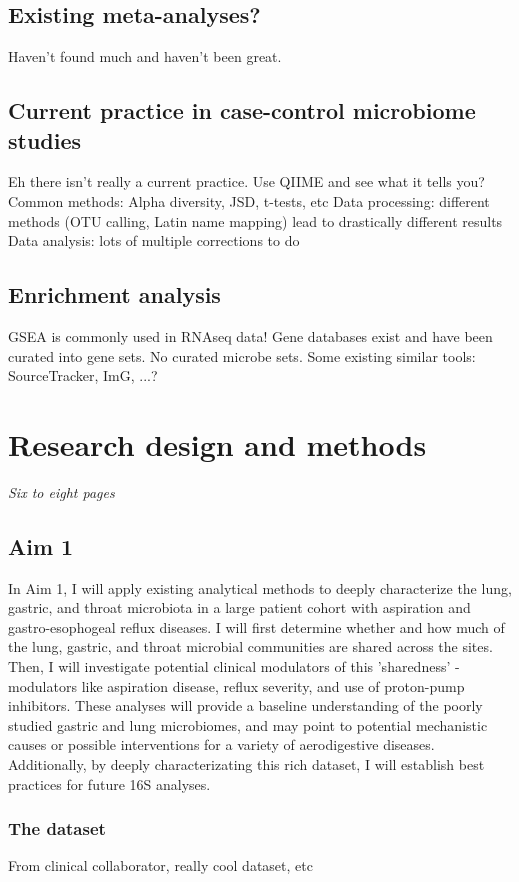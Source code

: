 \documentclass[12pt]{article}
\begin{document}
\subsection*{Existing meta-analyses?}
Haven't found much and haven't been great.

\subsection*{Current practice in case-control microbiome studies}
Eh there isn't really a current practice. Use QIIME and see what it tells you?
Common methods: Alpha diversity, JSD, t-tests, etc
Data processing: different methods (OTU calling, Latin name mapping) lead to drastically different results
Data analysis: lots of multiple corrections to do

\subsection*{Enrichment analysis}
GSEA is commonly used in RNAseq data! Gene databases exist and have been curated into gene sets.
No curated microbe sets. Some existing similar tools: SourceTracker, ImG, ...?

\section{Research design and methods}
\textit{Six to eight pages}
\subsection{Aim 1}
In Aim 1, I will apply existing analytical methods to deeply characterize the lung, gastric, and throat microbiota in a large patient cohort with aspiration and gastro-esophogeal reflux diseases. I will first determine whether and how much of the lung, gastric, and throat microbial communities are shared across the sites. Then, I will investigate potential clinical modulators of this 'sharedness' - modulators like aspiration disease, reflux severity, and use of proton-pump inhibitors. These analyses will provide a baseline understanding of the poorly studied gastric and lung microbiomes, and may point to potential mechanistic causes or possible interventions for a variety of aerodigestive diseases. Additionally, by deeply characterizating this rich dataset, I will establish best practices for future 16S analyses.

\subsubsection{The dataset}
From clinical collaborator, really cool dataset, etc
\end{document}
